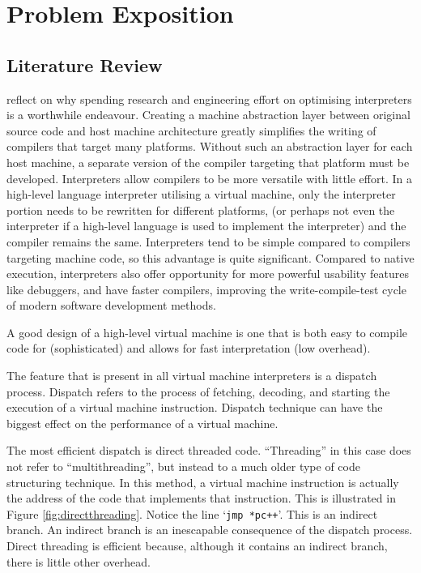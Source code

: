\chapter{Problem Exposition}
	\section{Literature Review}
		\cite{structureinterpreters} reflect on why spending research and engineering effort on optimising interpreters is a worthwhile endeavour. Creating a machine abstraction layer between original source code and host machine architecture greatly simplifies the writing of compilers that target many platforms. Without such an abstraction layer for each host machine, a separate version of the compiler targeting that platform must be developed. Interpreters allow compilers to be more versatile with little effort. In a high-level language interpreter utilising a virtual machine, only the interpreter portion needs to be rewritten for different platforms, (or perhaps not even the interpreter if a high-level language is used to implement the interpreter) and the compiler remains the same. Interpreters tend to be simple compared to compilers targeting machine code, so this advantage is quite significant. Compared to native execution, interpreters also offer opportunity for more powerful usability features like debuggers, and have faster compilers, improving the write-compile-test cycle of modern software development methods.
		
		A good design of a high-level virtual machine is one that is both easy to compile code for (sophisticated) and allows for fast interpretation (low overhead).
		
		The feature that is present in all virtual machine interpreters is a dispatch process. Dispatch refers to the process of fetching, decoding, and starting the execution of a virtual machine instruction. Dispatch technique can have the biggest effect on the performance of a virtual machine.
		
		The most efficient dispatch is direct threaded code. ``Threading'' in this case does not refer to ``multithreading'', but instead to a much older type of code structuring technique. In this method, a virtual machine instruction is actually the address of the code that implements that instruction. This is illustrated in Figure \ref{fig:directthreading}. Notice the line `\texttt{jmp *pc++}'. This is an indirect branch. An indirect branch is an inescapable consequence of the dispatch process. Direct threading is efficient because, although it contains an indirect branch, there is little other overhead.
		
